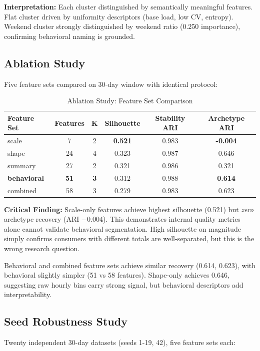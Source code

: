 \textbf{Interpretation:} Each cluster distinguished by semantically meaningful features. Flat cluster driven by uniformity descriptors (base load, low CV, entropy). Weekend cluster strongly distinguished by weekend ratio (0.250 importance), confirming behavioral naming is grounded.

\subsection{Ablation Study}

Five feature sets compared on 30-day window with identical protocol:

\begin{table}[h]
\centering
\small
\caption{Ablation Study: Feature Set Comparison}
\label{tab:ablation}
\begin{tabular}{@{}lccccc@{}}
\toprule
Feature Set & Features & K & Silhouette & Stability ARI & Archetype ARI \\
\midrule
scale & 7 & 2 & \textbf{0.521} & 0.983 & \textbf{-0.004} \\
shape & 24 & 4 & 0.323 & 0.987 & 0.646 \\
summary & 27 & 2 & 0.321 & 0.986 & 0.321 \\
\textbf{behavioral} & \textbf{51} & \textbf{3} & 0.312 & 0.988 & \textbf{0.614} \\
combined & 58 & 3 & 0.279 & 0.983 & 0.623 \\
\bottomrule
\end{tabular}
\end{table}

\textbf{Critical Finding:} Scale-only features achieve highest silhouette (0.521) but \emph{zero} archetype recovery (ARI $-0.004$). This demonstrates internal quality metrics alone cannot validate behavioral segmentation. High silhouette on magnitude simply confirms consumers with different totals are well-separated, but this is the wrong research question.

Behavioral and combined feature sets achieve similar recovery (0.614, 0.623), with behavioral slightly simpler (51 vs 58 features). Shape-only achieves 0.646, suggesting raw hourly bins carry strong signal, but behavioral descriptors add interpretability.

\subsection{Seed Robustness Study}

Twenty independent 30-day datasets (seeds 1-19, 42), five feature sets each:

